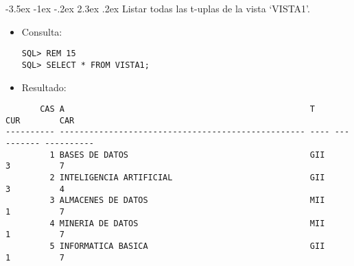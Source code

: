 \documentclass[11pt]{report}
\makeatletter
\renewcommand\chapter{\@startsection{chapter}{0}{\z@}%
    {-3.5ex \@plus -1ex \@minus -.2ex}%
    {2.3ex \@plus.2ex}%
    {\normalfont\Large\bfseries}}
\makeatother
\begin{document}
\chapter{Listar todas las t-uplas de la vista ‘VISTA1’.}
\begin{itemize}
  \item Consulta:
  \begin{verbatim}
SQL> REM 15
SQL> SELECT * FROM VISTA1;
  \end{verbatim}
  \item{Resultado:}
\end{itemize}
  \begin{verbatim}
       CAS A                                                  T           CUR        CAR                                                                                                                                                                                                                    
---------- -------------------------------------------------- ---- ---------- ----------                                                                                                                                                                                                                    
         1 BASES DE DATOS                                     GII           3          7                                                                                                                                                                                                                    
         2 INTELIGENCIA ARTIFICIAL                            GII           3          4                                                                                                                                                                                                                    
         3 ALMACENES DE DATOS                                 MII           1          7                                                                                                                                                                                                                    
         4 MINERIA DE DATOS                                   MII           1          7                                                                                                                                                                                                                    
         5 INFORMATICA BASICA                                 GII           1          7                                                                                                                                                                                                                    

\end{verbatim}
\end{document}
